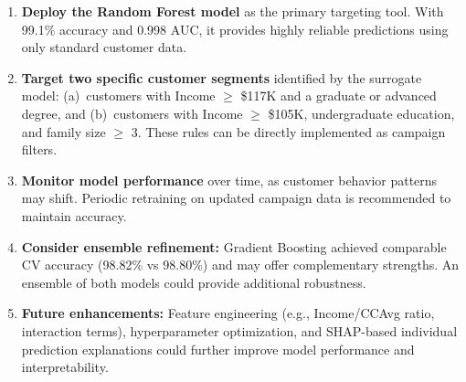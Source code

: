 \documentclass[11pt, a4paper]{article}
\begin{document}
\begin{enumerate}[leftmargin=*, itemsep=4pt]
    \item \textbf{Deploy the Random Forest model} as the primary targeting
          tool. With 99.1\% accuracy and 0.998 AUC, it provides highly reliable
          predictions using only standard customer data.

    \item \textbf{Target two specific customer segments} identified by the
          surrogate model: (a)~customers with Income $\geq$ \$117K and a
          graduate or advanced degree, and (b)~customers with Income $\geq$
          \$105K, undergraduate education, and family size $\geq$ 3. These
          rules can be directly implemented as campaign filters.

    \item \textbf{Monitor model performance} over time, as customer behavior
          patterns may shift. Periodic retraining on updated campaign data is
          recommended to maintain accuracy.

    \item \textbf{Consider ensemble refinement:} Gradient Boosting achieved
          comparable CV accuracy (98.82\% vs 98.80\%) and may offer
          complementary strengths. An ensemble of both models could provide
          additional robustness.

    \item \textbf{Future enhancements:} Feature engineering (e.g.,
          Income/CCAvg ratio, interaction terms), hyperparameter optimization,
          and SHAP-based individual prediction explanations could further
          improve model performance and interpretability.
\end{enumerate}
\end{document}
